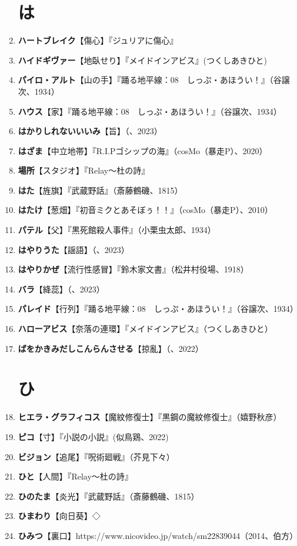 \documentclass[twocolumn]{jsbook}
\begin{document}
\begin{enumerate}
\section*{は}
    \item \textbf{ハートブレイク}【傷心】『ジュリアに傷心』
    \item \textbf{ハイドギヴァー}【地臥せり】『メイドインアビス』(つくしあきひと)
    \item \textbf{パイロ・アルト}【山の手】『踊る地平線：08　しっぷ・あほうい！』（谷譲次、1934）
    \item \textbf{ハウス}【家】『踊る地平線：08　しっぷ・あほうい！』（谷譲次、1934）
    \item \textbf{はかりしれないいいみ}【旨】（、2023）
    \item \textbf{はざま}【中立地帯】『R.I.Pゴシップの海』（cosMo（暴走P）、2020）
    \item \textbf{場所}【スタジオ】『Relay〜杜の詩』
    \item \textbf{はた}【旌旗】『武蔵野話』（斎藤鶴磯、1815）
    \item \textbf{はたけ}【葱畑】『初音ミクとあそぼぅ！！』（cosMo（暴走P）、2010）
    \item \textbf{パテル}【父】『黒死館殺人事件』（小栗虫太郎、1934）
    \item \textbf{はやりうた}【謡語】（、2023）
    \item \textbf{はやりかぜ}【流行性感冒】『鈴木家文書』（松井村役場、1918）
    \item \textbf{バラ}【絳蕊】（、2023）
    \item \textbf{パレイド}【行列】『踊る地平線：08　しっぷ・あほうい！』（谷譲次、1934）
    \item \textbf{ハローアビス}【奈落の連環】『メイドインアビス』（つくしあきひと）
    \item \textbf{ばをかきみだしこんらんさせる}【掠亂】（、2022）
\section*{ひ}
    \item \textbf{ヒエラ・グラフィコス}【魔紋修復士】『黒鋼の魔紋修復士』（嬉野秋彦）
    \item \textbf{ピコ}【寸】『小説の小説』(似鳥鶏、2022)
    \item \textbf{ビジョン}【追尾】『呪術廻戦』（芥見下々）
    \item \textbf{ひと}【人間】『Relay〜杜の詩』
    \item \textbf{ひのたま}【炎光】『武蔵野話』（斎藤鶴磯、1815）
    \item \textbf{ひまわり}【向日葵】◇
    \item \textbf{ひみつ}【裏口】https://www.nicovideo.jp/watch/sm22839044（2014、伯方）

\end{enumerate}
\end{document}
